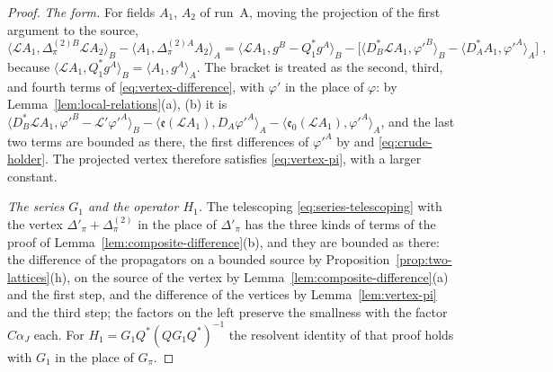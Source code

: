 \begin{proof}
\emph{The form.} For fields $A_1$, $A_2$ of run~A, moving the projection of the first argument to the source,
\[
    \langle\mathcal LA_1, \Delta^{(2)B}_\pi\mathcal LA_2\rangle_B - \langle A_1, \Delta^{(2)A}_\pi A_2\rangle_A = \bigl\langle\mathcal LA_1, g^B - Q_1^*g^A\bigr\rangle_B - \bigl[\langle D_B^*\mathcal LA_1, \varphi'^B\rangle_B - \langle D_A^*A_1, \varphi'^A\rangle_A\bigr]\;,
\]
because $\langle\mathcal LA_1, Q_1^*g^A\rangle_B = \langle A_1, g^A\rangle_A$. The bracket is treated as the second, third, and fourth terms of \eqref{eq:vertex-difference}, with $\varphi'$ in the place of $\varphi$: by Lemma~\ref{lem:local-relations}(a), (b) it is $\langle D_B^*\mathcal LA_1, \varphi'^B - \mathcal L'\varphi'^A\rangle_B - \langle\mathfrak e(\mathcal LA_1), D_A\varphi'^A\rangle_A - \langle\mathfrak e_0(\mathcal LA_1), \varphi'^A\rangle_A$, and the last two terms are bounded as there, the first differences of $\varphi'^A$ by \cite[(3.44)]{BalabanPBG} and \eqref{eq:crude-holder}. The projected vertex therefore satisfies \eqref{eq:vertex-pi}, with a larger constant.

\emph{The series $G_1$ and the operator $H_1$.} The telescoping \eqref{eq:series-telescoping} with the vertex $\Delta'_\pi + \Delta^{(2)}_\pi$ in the place of $\Delta'_\pi$ has the three kinds of terms of the proof of Lemma~\ref{lem:composite-difference}(b), and they are bounded as there: the difference of the propagators on a bounded source by Proposition~\ref{prop:two-lattices}(h), on the source of the vertex by Lemma~\ref{lem:composite-difference}(a) and the first step, and the difference of the vertices by Lemma~\ref{lem:vertex-pi} and the third step; the factors on the left preserve the smallness with the factor $C\alpha_J$ each. For $H_1 = G_1Q^*(QG_1Q^*)^{-1}$ the resolvent identity of that proof holds with $G_1$ in the place of $G_\pi$.


\end{proof}
